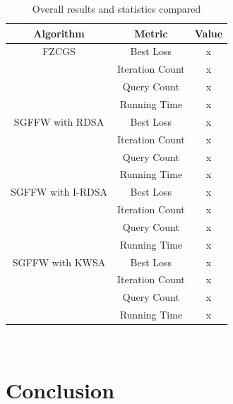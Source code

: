 \documentclass[10pt,twocolumn,letterpaper]{article}
\begin{document}
\begin{table}[h]
   \centering
   \begin{tabular}{ccc}
       \hline
       Algorithm & Metric & Value \\
       \hline
       FZCGS & Best Loss & x\\
            & Iteration Count & x\\
            & Query Count & x\\
            & Running Time & x\\
       \hline
       SGFFW with RDSA & Best Loss & x\\
                        & Iteration Count & x\\
                        & Query Count & x\\
                        & Running Time & x\\
       \hline
       SGFFW with I-RDSA & Best Loss & x\\
                        & Iteration Count & x\\
                        & Query Count & x\\
                        & Running Time & x\\
       \hline
       SGFFW with KWSA & Best Loss & x\\
                        & Iteration Count & x\\
                        & Query Count & x\\
                        & Running Time & x\\
       \hline
   \end{tabular}\\
   \caption{Overall results and statistics compared} 
   \label{tab:overall_results}
\end{table}

%
%



\section{Conclusion}
\end{document}
